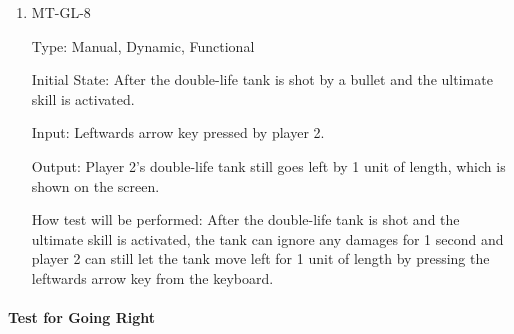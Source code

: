 \documentclass[12pt, titlepage]{article}
\begin{document}
\begin{enumerate}
\item{MT-GL-8\\}

Type: Manual, Dynamic, Functional
					
Initial State: After the double-life tank is shot by a bullet and the ultimate skill is activated.
					
Input: Leftwards arrow key pressed by player 2.
					
Output: Player 2's double-life tank still goes left by 1 unit of length, which is shown on the screen.
					
How test will be performed: After the double-life tank is shot and the ultimate skill is activated, the tank can ignore any damages for 1 second and player 2 can still let the tank move left for 1 unit of length by pressing the leftwards arrow key from the keyboard.

\end{enumerate}

\paragraph{Test for Going Right}
\end{document}

